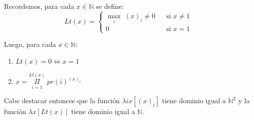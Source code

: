   \begin{lemma}
    \PN Recordemos, para cada $x \in \mathbb{N}$ se define:
    \[
      Lt(x) = \left\{\begin{array}{lll}
                      \max_{i} \; (x)_{i} \neq 0 && \text{si } x \neq 1 \\
                      0 & & \text{si } x = 1
                      \end{array} \right.
    \]

    \PN Luego, para cada $x \in \mathbb{N}$:

    \begin{enumerate}
      \item $Lt(x) = 0 \Leftrightarrow x = 1$
      \item $x = \underset{i=1}{\overset{Lt(x)}{\Pi}} \; pr(i)^{(x)_{i}}$
    \end{enumerate}

    \PN Cabe destacar entonces que la función $\lambda ix[(x)_{i}]$ tiene dominio igual a $\mathbb{N}^{2}$ y la
    función $\lambda x[Lt(x)]$ tiene dominio igual a $\mathbb{N}$.
  \end{lemma}
